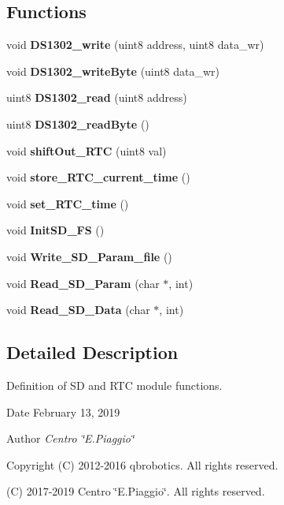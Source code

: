 \subsection*{Functions}
\begin{DoxyCompactItemize}
\item 
\mbox{\label{_s_d___r_t_c__functions_8h_ae916e48139e2369b4295bc32b754cb09}} 
void {\bfseries D\+S1302\+\_\+write} (uint8 address, uint8 data\+\_\+wr)
\item 
\mbox{\label{_s_d___r_t_c__functions_8h_abf7dafb7cb2decd885c06cfd0d508a86}} 
void {\bfseries D\+S1302\+\_\+write\+Byte} (uint8 data\+\_\+wr)
\item 
\mbox{\label{_s_d___r_t_c__functions_8h_a648ecf3d4f3a92e6390945b156d5c98a}} 
uint8 {\bfseries D\+S1302\+\_\+read} (uint8 address)
\item 
\mbox{\label{_s_d___r_t_c__functions_8h_a961280caa20d802239a974419c19437e}} 
uint8 {\bfseries D\+S1302\+\_\+read\+Byte} ()
\item 
\mbox{\label{_s_d___r_t_c__functions_8h_a1f5533e91998b92926173f479322c7d9}} 
void {\bfseries shift\+Out\+\_\+\+R\+TC} (uint8 val)
\item 
\mbox{\label{_s_d___r_t_c__functions_8h_a262170705e582875a383a9f5c9b137a7}} 
void {\bfseries store\+\_\+\+R\+T\+C\+\_\+current\+\_\+time} ()
\item 
\mbox{\label{_s_d___r_t_c__functions_8h_ad0181162f59bf423c6d1dc1556afb6fc}} 
void {\bfseries set\+\_\+\+R\+T\+C\+\_\+time} ()
\item 
\mbox{\label{_s_d___r_t_c__functions_8h_a56466454f41dc875787a75f0d78b5602}} 
void {\bfseries Init\+S\+D\+\_\+\+FS} ()
\item 
\mbox{\label{_s_d___r_t_c__functions_8h_a5072914b0c92c6825bb196ba84b332c4}} 
void {\bfseries Write\+\_\+\+S\+D\+\_\+\+Param\+\_\+file} ()
\item 
\mbox{\label{_s_d___r_t_c__functions_8h_ab859160c1aaa93a7acab54f21be69c1c}} 
void {\bfseries Read\+\_\+\+S\+D\+\_\+\+Param} (char $\ast$, int)
\item 
\mbox{\label{_s_d___r_t_c__functions_8h_a629e87adeb558dd2c752a3b5712af3ed}} 
void {\bfseries Read\+\_\+\+S\+D\+\_\+\+Data} (char $\ast$, int)
\end{DoxyCompactItemize}


\subsection{Detailed Description}
Definition of SD and R\+TC module functions. 

\begin{DoxyDate}{Date}
February 13, 2019 
\end{DoxyDate}
\begin{DoxyAuthor}{Author}
{\itshape Centro \char`\"{}\+E.\+Piaggio\char`\"{}} 
\end{DoxyAuthor}
\begin{DoxyCopyright}{Copyright}
(C) 2012-\/2016 qbrobotics. All rights reserved. 

(C) 2017-\/2019 Centro \char`\"{}\+E.\+Piaggio\char`\"{}. All rights reserved. 
\end{DoxyCopyright}
